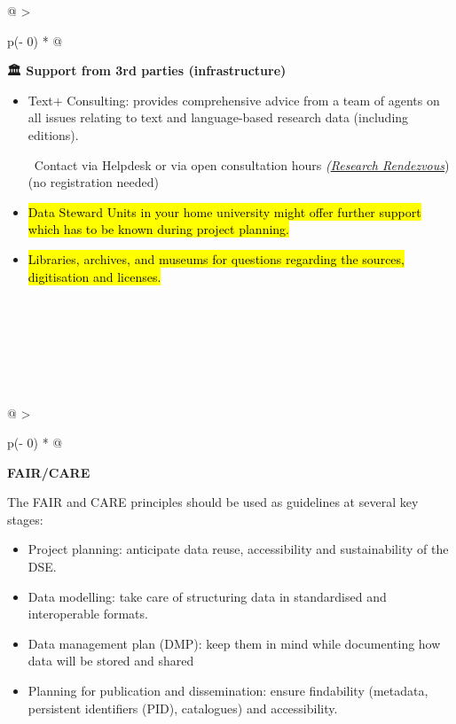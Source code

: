 \documentclass[
  letterpaper,
  DIV=11,
  numbers=noendperiod]{scrreprt}
\begin{document}
\begin{longtable}[]{@{}
  >{\raggedright\arraybackslash}p{(\columnwidth - 0\tabcolsep) * }@{}}
\toprule\noalign{}
\begin{minipage}[b]{\linewidth}\raggedright
\textbf{🏛️ Support from 3rd parties (infrastructure)} \textbar{}

\begin{itemize}
\item
  Text+ Consulting: provides comprehensive advice from a team of agents
  on all issues relating to text and language-based research data
  (including editions).\\
  \strut ~Contact via Helpdesk or via open consultation hours
  \emph{(\href{https://text-plus.org/en/daten-dienste/consulting/\#research-rendezvous}{Research
  Rendezvous}}) (no registration needed)
\item
  \hl{Data Steward Units in your home university might offer further
  support which has to be known during project planning.}
\item
  \hl{Libraries, archives, and museums for questions regarding the
  sources, digitisation and licenses.}
\end{itemize}\strut
\end{minipage} \\
\midrule\noalign{}
\endhead
\bottomrule\noalign{}
\endlastfoot
 \\
\end{longtable}

~

~

\begin{longtable}[]{@{}
  >{\raggedright\arraybackslash}p{(\columnwidth - 0\tabcolsep) * }@{}}
\toprule\noalign{}
\begin{minipage}[b]{\linewidth}\raggedright
\textbf{FAIR/CARE}

The FAIR and CARE principles should be used as guidelines at several key
stages:

\begin{itemize}
\item
  Project planning: anticipate data reuse, accessibility and
  sustainability of the DSE.
\item
  Data modelling: take care of structuring data in standardised and
  interoperable formats.
\item
  Data management plan (DMP): keep them in mind while documenting how
  data will be stored and shared
\item
  Planning for publication and dissemination: ensure findability
  (metadata, persistent identifiers (PID), catalogues) and
  accessibility.
\end{itemize}
\end{minipage} \\
\midrule\noalign{}
\endhead
\bottomrule\noalign{}
\endlastfoot
 \\
\end{longtable}
\end{document}
